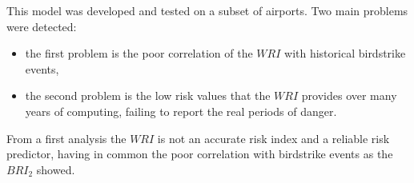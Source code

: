 This model was developed and tested on a subset of airports.
Two main problems were detected:
\begin{itemize}
    \item the first problem is the poor correlation of the $WRI$ with historical birdstrike events,
    \item the second problem is the low risk values that the $WRI$ provides over many years of computing, failing to report the real periods of danger.
\end{itemize}
From a first analysis the $WRI$ is not an accurate risk index and a reliable risk predictor, having in common the poor correlation with birdstrike events as the $BRI_2$ showed. 



